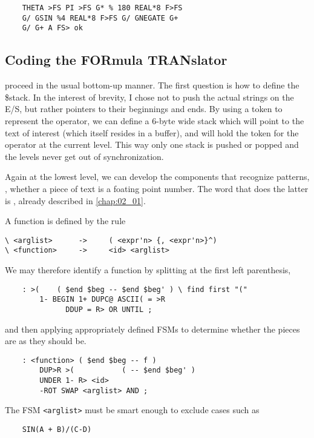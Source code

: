 \begin{lstlisting}
    THETA >FS PI >FS G* % 180 REAL*8 F>FS
    G/ GSIN %4 REAL*8 F>FS G/ GNEGATE G+
    G/ G+ A FS> ok
\end{lstlisting}

\subsection{Coding the FORmula TRANslator}
 proceed in the usual bottom-up manner. The first question is how to define the \$stack. In the interest of brevity, I chose not to push the actual strings on the E/S, but rather pointers to their beginnings and ends. By using a token to represent the operator, we can define a 6-byte wide stack which will point to the text of interest (which itself resides in a buffer), and will hold the token for the operator at the current level. This way only one stack is pushed or popped and the levels never get out of synchronization.

Again at the lowest level, we can develop the components that recognize patterns, \eg, whether a piece of text is a foating point number. The word that does the latter is , already described in \ref{chap:02_01}.

A function is defined by the rule

\begin{verbatim}
\ <arglist>      ->     ( <expr'n> {, <expr'n>}^)
\ <function>     ->     <id> <arglist>
\end{verbatim}

We may therefore identify a function by splitting at the first left parenthesis,

\begin{lstlisting}
    : >(    ( $end $beg -- $end $beg' ) \ find first "("
        1- BEGIN 1+ DUPC@ ASCII( = >R
              DDUP = R> OR UNTIL ;
\end{lstlisting}

and then applying appropriately defined FSMs to determine whether the pieces are as they should be.

\begin{lstlisting}
    : <function> ( $end $beg -- f )
        DUP>R >(           ( -- $end $beg' )
        UNDER 1- R> <id>
        -ROT SWAP <arglist> AND ;
\end{lstlisting}

The FSM \texttt{<arglist>} must be smart enough to exclude cases such as

\begin{lstlisting}
    SIN(A + B)/(C-D)
\end{lstlisting}

